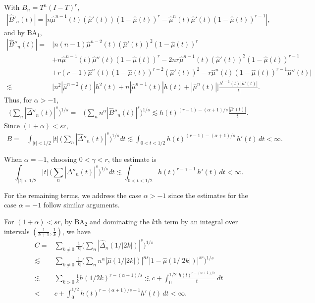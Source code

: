 \documentclass[11pt]{amsart}
\theoremstyle{definition}
\theoremstyle{remark}
\begin{document}
With $B_n=T^n (I-T)^r$,
\begin{align}
|\hat B'_n(t)| = | n \hat\mu^{n-1}(t) (\hat \mu'(t)) (1-\hat\mu(t))^r 
     - \hat\mu^{n}(t) \hat \mu'(t)(1-\hat\mu(t))^{r-1}|, \label{eq:Bprime} 
\end{align}
and by $\text{BA}_1$,
\begin{align*}
|\hat B''_n(t)| = & \big| n(n-1) \hat\mu^{n-2}(t) (\hat \mu'(t))^2 (1-\hat\mu(t))^r \\
   &  +n \hat\mu^{n-1}(t) \hat \mu''(t)(1-\hat\mu(t))^r 
 - 2n r \hat\mu^{n-1}(t) (\hat \mu'(t))^2 (1-\hat\mu(t))^{r-1}  \\
&+ r (r-1) \hat\mu^{n}(t) (1-\hat\mu(t))^{r-2}  (\hat\mu'(t))^2
 - r \hat\mu^{n}(t) (1-\hat\mu(t))^{r-1}  \hat \mu''(t) \big| \\
\lesssim & \Big[ n^2 |\hat\mu^{n-2}(t)| h^{2}(t) + 
n |\hat\mu^{n-1}(t)| h(t) 
 + |\hat\mu^{n}(t)|   \Big]  \frac{h^{r-1}(t)|\hat\mu'(t)|}{|t|}.
\end{align*}
%
Thus, for $\alpha>-1$,
\begin{align}
\Big(\sum_n   |\hat \Delta''_n (t)|^s\Big)^{1/s}= & \Big( \sum_n n^{\alpha}  |\hat B''_n (t)|^s\Big)^{1/s}  %
\lesssim    
h(t)^{(r-1)-(\alpha+1)/s}  \frac{|\hat\mu'(t)|}{|t|}.\label{eq:B} %
\end{align}
Since $(1+\alpha)< s r $,
\begin{align*}
B= &  \int_{|t|<1/2} |t| \, \Big( \sum_n   |\hat\Delta''_n(t)|^s  \Big)^{1/s} dt   
 \lesssim   \int_{0<t<1/2}   h(t)^{(r-1)-(\alpha+1)/s } \, h'(t) \, dt <\infty.   
\end{align*} 

When $\alpha=-1$, choosing $0<\gamma<r$, the estimate is
\[   \int_{|t|<1/2} |t| \, \Big( \sum_n   |\hat\Delta''_n(t)|^s  \Big)^{1/s} dt   
 \lesssim   \int_{0<t<1/2}   h(t)^{r-\gamma-1 } \, h'(t) \, dt <\infty.  \]


For the remaining terms, we address the case $\alpha>-1$ since the estimates for the case $\alpha=-1$ follow similar arguments.

For $(1+\alpha)< s r $, by $\text{BA}_2$ and dominating the $k$th term by an integral over intervals $(\frac 1{k+1},\frac 1k)$, we have
\begin{align*}
 C= & \sum_{k\neq 0} \frac 1{|k|}
\Big(    \sum_n   |\hat\Delta_n(1/|2k| )|^s  \Big)^{1/s} \nonumber \\
\lesssim &  \sum_{k\neq 0} \frac 1{|k|} \Big(    \sum_n n^{\alpha} |\hat\mu(1/|2k|)|^{ns} 
|1-\hat\mu(1/|2k|)|^{s r}  \Big)^{1/s} \nonumber  \\
\lesssim & \sum_{k> 0} \frac 1k  h(1/2k)^{r - (\alpha+1)/s}
\lesssim c+ \int_0^{1/2} \frac{h(t)^{r - (\alpha+1)/s}}t \, dt   \nonumber \\
< & c+ \int_0^{1/2} h(t)^{r - (\alpha+1)/s-1} h'(t)\, dt <\infty.
\end{align*}
\end{document}
